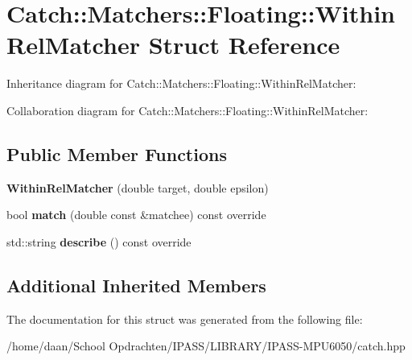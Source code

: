 \hypertarget{structCatch_1_1Matchers_1_1Floating_1_1WithinRelMatcher}{}\section{Catch\+:\+:Matchers\+:\+:Floating\+:\+:Within\+Rel\+Matcher Struct Reference}
\label{structCatch_1_1Matchers_1_1Floating_1_1WithinRelMatcher}


Inheritance diagram for Catch\+:\+:Matchers\+:\+:Floating\+:\+:Within\+Rel\+Matcher\+:


Collaboration diagram for Catch\+:\+:Matchers\+:\+:Floating\+:\+:Within\+Rel\+Matcher\+:
\subsection*{Public Member Functions}
\begin{DoxyCompactItemize}
\item 
\mbox{\label{structCatch_1_1Matchers_1_1Floating_1_1WithinRelMatcher_aadfe37f6ed9bb025c93e51e11d8bee43}} 
{\bfseries Within\+Rel\+Matcher} (double target, double epsilon)
\item 
\mbox{\label{structCatch_1_1Matchers_1_1Floating_1_1WithinRelMatcher_ac4fc68ff316028137a6d940e10d78e12}} 
bool {\bfseries match} (double const \&matchee) const override
\item 
\mbox{\label{structCatch_1_1Matchers_1_1Floating_1_1WithinRelMatcher_aeabbf5394d7dafebe874fef8a959fe8a}} 
std\+::string {\bfseries describe} () const override
\end{DoxyCompactItemize}
\subsection*{Additional Inherited Members}


The documentation for this struct was generated from the following file\+:\begin{DoxyCompactItemize}
\item 
/home/daan/\+School Opdrachten/\+I\+P\+A\+S\+S/\+L\+I\+B\+R\+A\+R\+Y/\+I\+P\+A\+S\+S-\/\+M\+P\+U6050/catch.\+hpp\end{DoxyCompactItemize}
